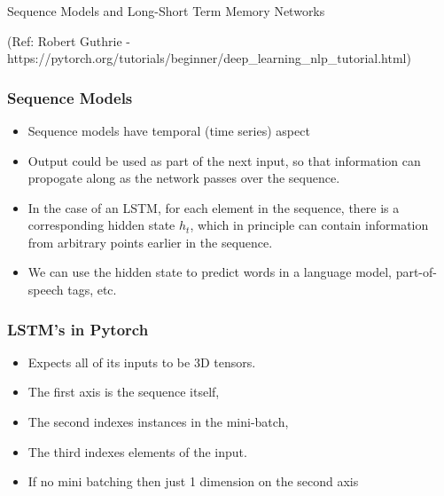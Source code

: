 \begin{frame}[fragile]\frametitle{}

\begin{center}
{\Large Sequence Models and Long-Short Term Memory Networks}

(Ref:  Robert Guthrie -  https://pytorch.org/tutorials/beginner/deep\_learning\_nlp\_tutorial.html)
\end{center}
\end{frame}

\begin{frame}[fragile]
\frametitle{Sequence Models}

\begin{itemize}
\item Sequence models have temporal (time series) aspect
\item Output could be used as part of the next input, so that information can propogate along as the network passes over the sequence. 
\item In the case of an LSTM, for each element in the sequence, there is a corresponding hidden state $h_t$, which in principle can contain information from arbitrary points earlier in the sequence. 
\item We can use the hidden state to predict words in a language model, part-of-speech tags, etc.
\end{itemize}
       
\end{frame} 

\begin{frame}[fragile]
\frametitle{LSTM's in Pytorch}

\begin{itemize}
\item Expects all of its inputs to be 3D tensors. 
\item The first axis is the sequence itself, 
\item The second indexes instances in the mini-batch, 
\item The third indexes elements of the input.
\item If no mini batching then just 1 dimension on the second axis
\end{itemize}
       
\end{frame} 

